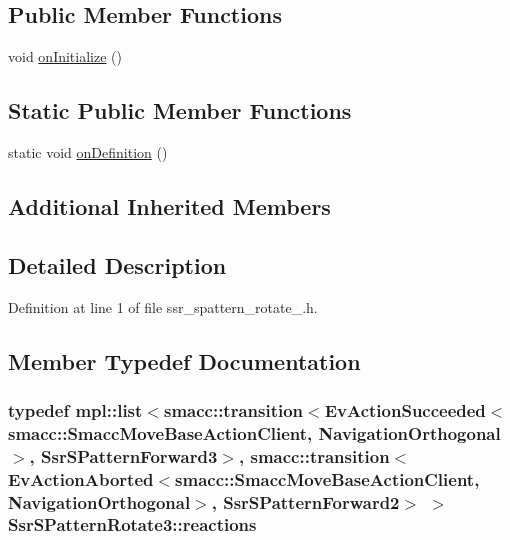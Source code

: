 \subsection*{Public Member Functions}
\begin{DoxyCompactItemize}
\item 
void \hyperlink{structSsrSPatternRotate3_a343a04a297e2b3801e4f7224fa6517a5}{on\+Initialize} ()
\end{DoxyCompactItemize}
\subsection*{Static Public Member Functions}
\begin{DoxyCompactItemize}
\item 
static void \hyperlink{structSsrSPatternRotate3_abd553dc366393f10fb622eb717b92f1b}{on\+Definition} ()
\end{DoxyCompactItemize}
\subsection*{Additional Inherited Members}


\subsection{Detailed Description}


Definition at line 1 of file ssr\+\_\+spattern\+\_\+rotate\+\_.\+h.



\subsection{Member Typedef Documentation}
\subsubsection[{\texorpdfstring{reactions}{reactions}}]{\setlength{\rightskip}{0pt plus 5cm}typedef mpl\+::list$<${\bf smacc\+::transition}$<$Ev\+Action\+Succeeded$<${\bf smacc\+::\+Smacc\+Move\+Base\+Action\+Client}, {\bf Navigation\+Orthogonal}$>$, {\bf Ssr\+S\+Pattern\+Forward3}$>$, {\bf smacc\+::transition}$<$Ev\+Action\+Aborted$<${\bf smacc\+::\+Smacc\+Move\+Base\+Action\+Client}, {\bf Navigation\+Orthogonal}$>$, {\bf Ssr\+S\+Pattern\+Forward2}$>$ $>$ {\bf Ssr\+S\+Pattern\+Rotate3\+::reactions}}\hypertarget{structSsrSPatternRotate3_a3e6c9cdc8f767af817ffad1adc653888}{}\label{structSsrSPatternRotate3_a3e6c9cdc8f767af817ffad1adc653888}


